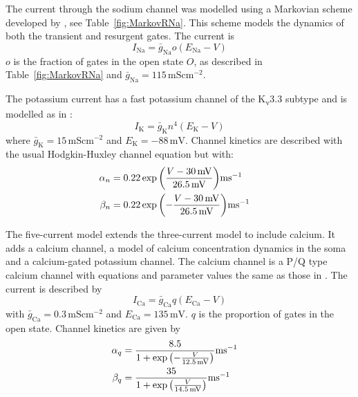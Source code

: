 \documentclass[twocolumn]{svjour3}          %
\newcommand{\mv}{\,\mathrm{mV}}
\newcommand{\msi}{\,\mathrm{mS cm^{-2}}}
\renewcommand{\k}{\mathrm{K}}
\newcommand{\ca}{\mathrm{Ca}}
\newcommand{\na}{\mathrm{Na}}
\begin{document}
The current through the sodium channel was modelled using a Markovian
scheme developed by \citet{RamanBean2001}, see
Table~\ref{fig:MarkovRNa}. This scheme models the dynamics of both the
transient and resurgent gates. The current is
\begin{equation}
\label{eq:I_RNa}
I_{\na} = \bar{g}_\na o (E_\na-V)
\end{equation}
$o$ is the fraction of gates in the open state $O$, as described in Table~\ref{fig:MarkovRNa} and $\bar{g}_\na=115\msi$.

The potassium current has a fast potassium channel of the K\textsubscript{v}3.3 subtype and is modelled as in
\citet{MasoliEtAl2015}:
\begin{equation}
\label{eq:I_K}
I_{\k} = \bar{g}_{\k} n^4(E_{\k}-V)
\end{equation}
where $\bar{g}_{\k}= 15\msi$ and $E_{\k}=-88\mv$. Channel kinetics are described with the usual Hodgkin-Huxley channel equation but with:
\begin{align}
\label{eq:n_kinetics}
\alpha_{n} &= 0.22
\exp{\left(\frac{V-30\mv}{26.5\mv}\right)}\mathrm{ms}^{-1}\cr 
\beta_{n} &= 0.22
\exp{\left(-\frac{V-30\mv}{26.5\mv}\right)}\mathrm{ms}^{-1}
\end{align}

The five-current model extends the three-current model to include
calcium. It adds a calcium channel, a model of calcium concentration
dynamics in the soma and a calcium-gated potassium channel. The
calcium channel is a P/Q type calcium channel with equations and
parameter values the same as those in \citet{MiyashoEtAl2001}. The
current is described by
\begin{equation}
\label{eq:I_Ca}
I_\ca =\bar{g}_{\ca} q(E_\ca-V)
\end{equation}
with $\bar{g}_\ca= 0.3\msi$ and $E_\ca = 135\mv$. $q$ is the proportion of gates in the open state. Channel kinetics are given by
\begin{align}
\label{eq:q_kinetics}
\alpha_{q} &= \frac{8.5}{ 1 +
  \exp{\left(-\frac{V}{12.5\mv}\right)}}\mathrm{ms}^{-1}\cr \beta_{q} &=
\frac{35}{ 1 + \exp{\left(\frac{V}{14.5\mv}\right)}}\mathrm{ms}^{-1}
\end{align}
\end{document}
